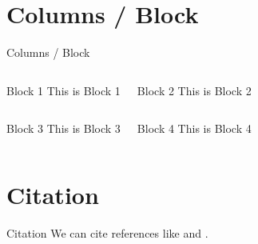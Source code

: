 \documentclass[11pt,aspectratio=169]{beamer}
\begin{document}
\section{Columns / Block}
\begin{frame}{Columns / Block}

\begin{columns}
\begin{block}{Block 1}
This is Block 1
\end{block}

\begin{block}{Block 2}
This is Block 2
\end{block}
\end{columns}

\begin{columns}
\begin{block}{Block 3}
This is Block 3
\end{block}

\begin{block}{Block 4}
This is Block 4
\end{block}
\end{columns}

\end{frame}

\section{Citation}
\begin{frame}{Citation}
We can cite references like \cite{siess2000} and \cite{stepien2002}.
\end{frame}

\section{\refname}
\begin{frame}{\refname}



\end{frame}
\end{document}
